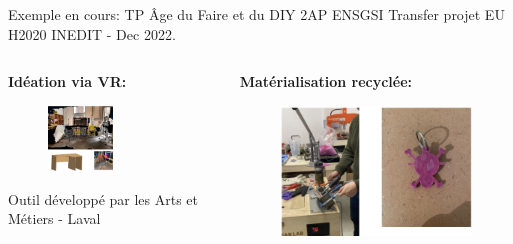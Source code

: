 \documentclass[
  11pt,
  ignorenonframetext,
  aspectratio=169,
  c]{beamer}
\begin{document}
\begin{frame}{Exemple en cours: TP Âge du Faire et du DIY \hfill 2AP
ENSGSI}
\protect\hypertarget{exemple-en-cours-tp-uxe2ge-du-faire-et-du-diy-2ap-ensgsi}{}
Transfer projet EU H2020 INEDIT - Dec 2022.

\begin{columns}[T]
\begin{column}{0.6\textwidth}
\textbf{Idéation via VR:}

\begin{figure}

{\centering \includegraphics[width=0.5\textwidth,height=\textheight]{Figures/slides/Age-faire.jpg}

}

\end{figure}

\tiny Outil développé par les Arts et Métiers - Laval
\end{column}

\begin{column}{0.4\textwidth}
\textbf{Matérialisation recyclée:}

\begin{figure}

{\centering \includegraphics[width=1\textwidth,height=\textheight]{Figures/slides/Age-faire-1.png}

}

\end{figure}
\end{column}
\end{columns}
\end{frame}
\end{document}
